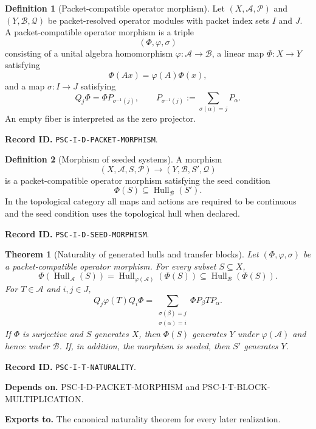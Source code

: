 \documentclass[11pt]{article}
\newtheorem{theorem}{Theorem}[section]
\theoremstyle{definition}
\newtheorem{definition}[definition]{Definition}
\theoremstyle{remark}
\newcommand{\A}{\mathcal A}
\newcommand{\B}{\mathcal B}
\newcommand{\Pcal}{\mathcal P}
\newcommand{\Qcal}{\mathcal Q}
\newcommand{\Hull}{\operatorname{Hull}}
\newcommand{\RecordID}[1]{\par\smallskip\noindent\begingroup\footnotesize\color{PSCGray}\raggedright\textbf{Record ID.} \nolinkurl{#1}.\par\endgroup}
\newcommand{\Depends}[1]{\par\noindent\begingroup\footnotesize\color{PSCGray}\raggedright\textbf{Depends on.} #1\par\endgroup}
\newcommand{\Exports}[1]{\par\noindent\begingroup\footnotesize\color{PSCGray}\raggedright\textbf{Exports to.} #1\par\endgroup}
\begin{document}
\begin{definition}[Packet-compatible operator morphism]
\label{def:packet-morphism}
Let $(X,\A,\Pcal)$ and $(Y,\B,\Qcal)$ be packet-resolved operator modules with packet index sets $I$ and $J$.  A packet-compatible operator morphism is a triple
\[
(\Phi,\varphi,\sigma)
\]
consisting of a unital algebra homomorphism $\varphi:\A\to\B$, a linear map $\Phi:X\to Y$ satisfying
\[
\Phi(Ax)=\varphi(A)\Phi(x),
\]
and a map $\sigma:I\to J$ satisfying
\[
Q_j\Phi
=
\Phi P_{\sigma^{-1}(j)},
\qquad
P_{\sigma^{-1}(j)}:=
\sum_{\sigma(\alpha)=j}P_\alpha.
\]
An empty fiber is interpreted as the zero projector.
\end{definition}
\RecordID{PSC-I-D-PACKET-MORPHISM}

\begin{definition}[Morphism of seeded systems]
\label{def:seed-morphism}
A morphism
\[
(X,\A,S,\Pcal)\longrightarrow(Y,\B,S',\Qcal)
\]
is a packet-compatible operator morphism satisfying the seed condition
\[
\Phi(S)\subseteq\Hull_\B(S').
\]
In the topological category all maps and actions are required to be continuous and the seed condition uses the topological hull when declared.
\end{definition}
\RecordID{PSC-I-D-SEED-MORPHISM}

\begin{theorem}[Naturality of generated hulls and transfer blocks]
\label{thm:naturality}
Let $(\Phi,\varphi,\sigma)$ be a packet-compatible operator morphism.  For every subset $S\subseteq X$,
\[
\boxed{
\Phi(\Hull_\A(S))
=
\Hull_{\varphi(\A)}(\Phi(S))
\subseteq
\Hull_\B(\Phi(S)).
}
\]
For $T\in\A$ and $i,j\in J$,
\[
\boxed{
Q_j\varphi(T)Q_i\Phi
=
\sum_{\substack{\sigma(\beta)=j\\\sigma(\alpha)=i}}
\Phi P_\beta TP_\alpha.
}
\]
If $\Phi$ is surjective and $S$ generates $X$, then $\Phi(S)$ generates $Y$ under $\varphi(\A)$ and hence under $\B$.  If, in addition, the morphism is seeded, then $S'$ generates $Y$.
\end{theorem}
\RecordID{PSC-I-T-NATURALITY}
\Depends{PSC-I-D-PACKET-MORPHISM and PSC-I-T-BLOCK-MULTIPLICATION.}
\Exports{The canonical naturality theorem for every later realization.}
\end{document}
